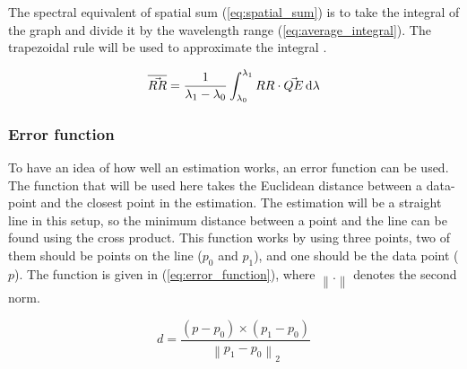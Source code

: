The spectral equivalent of spatial sum (\ref{eq:spatial_sum}) is to take the integral of the graph and divide it by the wavelength range (\ref{eq:average_integral}). The trapezoidal rule will be used to approximate the integral \cite{TrapezoidRuleMathematical}. 

\begin{equation}
    \label{eq:average_integral}
    \overline{\vec{RR}} = \frac{1}{\lambda_1 - \lambda_0} \int_{\lambda_0}^{\lambda_1} RR \cdot \vec{QE} \,\mathrm{d}\lambda 
\end{equation}

\subsubsection{Error function}
\label{sec:error_function}
To have an idea of how well an estimation works, an error function can be used. The function that will be used here takes the Euclidean distance between a data-point and the closest point in the estimation. The estimation will be a straight line in this setup, so the minimum distance between a point and the line can be found using the cross product. This function works by using three points, two of them should be points on the line ($p_0$ and $p_1$), and one should be the data point ($p$). The function is given in (\ref{eq:error_function}), where $\left\lVert .\right\rVert$ denotes the second norm. 

\begin{equation}
    \label{eq:error_function}
    d = \frac{(p - p_0) \times (p_1 - p_0)}{\left\lVert p_1 - p_0\right\rVert _2}
\end{equation}